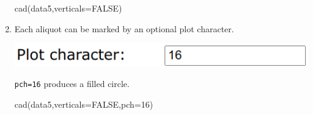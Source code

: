 \begin{refsection}
\begin{enumerate}
\begin{console}
cad(data5,verticals=FALSE)
\end{console}

\item Each aliquot can be marked by an optional plot character.

\noindent\begin{minipage}[t]{.4\linewidth}
\strut\vspace*{-\baselineskip}\newline
\includegraphics[width=\linewidth]{../figures/UPbCADpch.png}
\end{minipage}
\begin{minipage}[t]{.6\linewidth}
  \texttt{pch=16} produces a filled circle.
\end{minipage}

\begin{console}
cad(data5,verticals=FALSE,pch=16)
\end{console}

\end{enumerate}

\printbibliography[heading=subbibliography]

\end{refsection}

